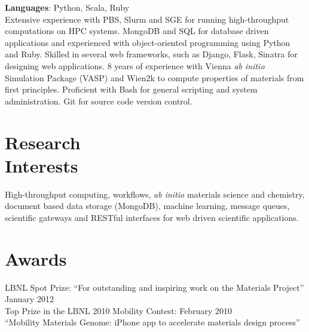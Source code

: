 \documentclass[margin,line]{resume}
\begin{document}
\begin{resume}
    \textbf{Languages}: Python, Scala, Ruby\vspace{2mm}\\
                Extensive experience with PBS, Slurm and SGE for running high-throughput
                computations on HPC systems. MongoDB and SQL for database driven
                applications and experienced with object-oriented programming using
                Python and Ruby. Skilled in several web frameworks, such as Django, Flask, Sinatra for designing web
                applications. 8 years of experience with Vienna
                \textsl{ab initio} Simulation Package (VASP) and Wien2k to compute properties of materials from first principles. Proficient with Bash for general scripting and system administration. Git for source code version control.




    \section{\mysidestyle Research\\Interests}

    High-throughput computing, workflows, \textsl{ab initio} materials science
    and chemistry, document based data storage (MongoDB),
    machine learning, message queues, scientific gateways and RESTful interfaces for web driven scientific applications.


    \section{\mysidestyle Awards}
    LBNL Spot Prize: ``For outstanding and inspiring
      work on the Materials Project'' \hfill January 2012\vspace{2mm}\\
    Top Prize in the LBNL 2010 Mobility Contest: \hfill February 2010\\
      ``Mobility Materials Genome: iPhone app to
       accelerate materials design process''

    

\end{resume}
\end{document}
